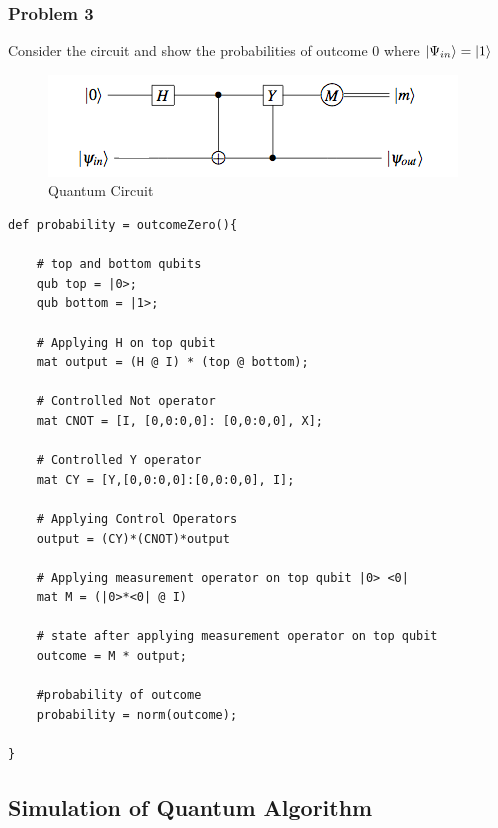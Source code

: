 \subsubsection{Problem 3}
Consider the circuit and show the probabilities of outcome 0 where $|\Psi_{in}\rangle = |1\rangle$
\begin{figure}[h!]
\begin{center}
\includegraphics{ref/circuit2}
\end{center}
\caption{ Quantum Circuit\label{cir1}}
\end{figure}

\begin{lstlisting}
def probability = outcomeZero(){
	
	# top and bottom qubits
	qub top = |0>;
	qub bottom = |1>;
	
	# Applying H on top qubit 
	mat output = (H @ I) * (top @ bottom);
	
	# Controlled Not operator
	mat CNOT = [I, [0,0:0,0]: [0,0:0,0], X];
	
	# Controlled Y operator
	mat CY = [Y,[0,0:0,0]:[0,0:0,0], I];
	
	# Applying Control Operators
	output = (CY)*(CNOT)*output
	
	# Applying measurement operator on top qubit |0> <0|
	mat M = (|0>*<0| @ I)
	
	# state after applying measurement operator on top qubit
	outcome = M * output;
	
	#probability of outcome
	probability = norm(outcome);
	
}
\end{lstlisting}

\subsection{ Simulation of Quantum Algorithm}

